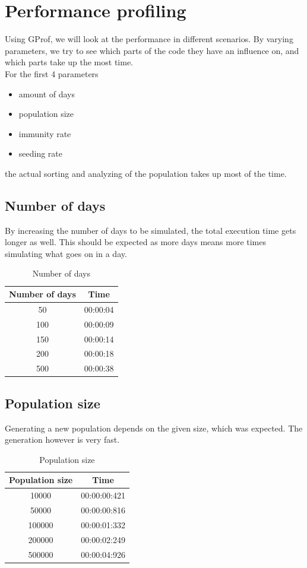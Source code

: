 \documentclass[runningheads]{llncs}
\begin{document}
\clearpage
\section{Performance profiling}
Using GProf, we will look at the performance in different scenarios. By varying parameters, we try to see which parts of the code they have an influence on, and which parts take up the most time. 
\\
For the first 4 parameters
\begin{itemize}
	\item amount of days
	\item population size
	\item immunity rate
	\item seeding rate
\end{itemize}
the actual sorting and analyzing of the population takes up most of the time.

\subsection{Number of days}
By increasing the number of days to be simulated, the total execution time gets longer as well. This should be expected as more days means more times simulating what goes on in a day.
\begin{table}[!h]
	\centering
	\begin{tabular}{|c|c|}
		\hline
		Number of days & Time \\\hline
		50  & 00:00:04 \\\hline
    	100 & 00:00:09 \\\hline
    	150 & 00:00:14 \\\hline
    	200	& 00:00:18 \\\hline
    	500 & 00:00:38 \\
    	\hline
	\end{tabular}
	\caption{Number of days}
\end{table}

\subsection{Population size}
Generating a new population depends on the given size, which was expected. The generation however is very fast.
\begin{table}[!h]
	\centering
	\begin{tabular}{|c|c|}
		\hline
		Population size & Time \\\hline
	    10000  & 00:00:00:421 \\\hline
	    50000  & 00:00:00:816 \\\hline
	    100000 & 00:00:01:332 \\\hline
 	    200000 & 00:00:02:249 \\\hline
 	    500000 & 00:00:04:926 \\
    	\hline
	\end{tabular}
	\caption{Population size}
\end{table}
\end{document}
